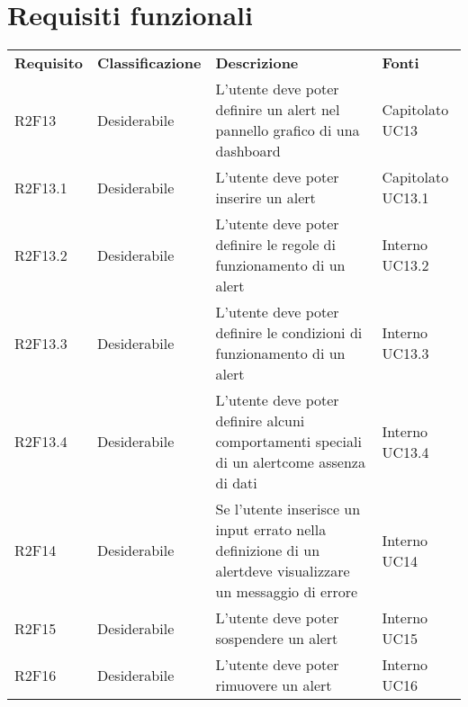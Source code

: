 \section{Requisiti funzionali}
	\begin{longtable} {
		>{}p{24mm} 
		>{}p{32mm}
		>{}p{40mm} 
		>{}p{24.5mm}
		}
	\rowcolor{gray!50}
		\textbf{Requisito} & 
		\textbf{Classificazione} & 
		\textbf{Descrizione} & 
		\textbf{Fonti} 	\TBstrut \\
		
		R2F13 &	Desiderabile & L'utente deve poter definire un alert nel pannello grafico di una dashboard\glo & Capitolato UC13 \TBstrut \\ [2mm]			
		R2F13.1 & Desiderabile & L'utente deve poter inserire un alert & Capitolato UC13.1 \TBstrut \\ [2mm]		
		R2F13.2 & Desiderabile & L'utente deve poter definire le regole di funzionamento di un alert\glo & Interno UC13.2 \TBstrut \\ [2mm]		
		R2F13.3 & Desiderabile & L'utente deve poter definire le condizioni di funzionamento di un alert\glo & Interno UC13.3 \TBstrut \\ [2mm]
		R2F13.4 & Desiderabile & L'utente deve poter definire alcuni comportamenti speciali di un alert\glo come assenza di dati & Interno UC13.4 \TBstrut \\ [2mm]		
		R2F14 &	Desiderabile & Se l'utente inserisce un input errato nella definizione di un alert\glosp deve visualizzare un messaggio di errore &	Interno UC14 \TBstrut \\ [2mm]
		R2F15 &	Desiderabile & L'utente deve poter sospendere un alert\glo & Interno UC15 \TBstrut \\ [2mm]		
		R2F16 & Desiderabile & L'utente deve poter rimuovere un alert\glo & Interno UC16 \TBstrut \\ [2mm]		
	\end{longtable}
